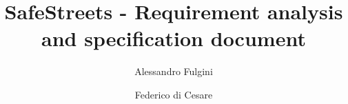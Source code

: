 \documentclass[draft=false]{scrreprt}
\title{SafeStreets - Requirement analysis and specification document}
\author{Alessandro Fulgini \and Federico di Cesare}
\begin{document}
  \begin{titlepage}
    
  \end{titlepage}
  

  \tableofcontents

  
\end{document}
